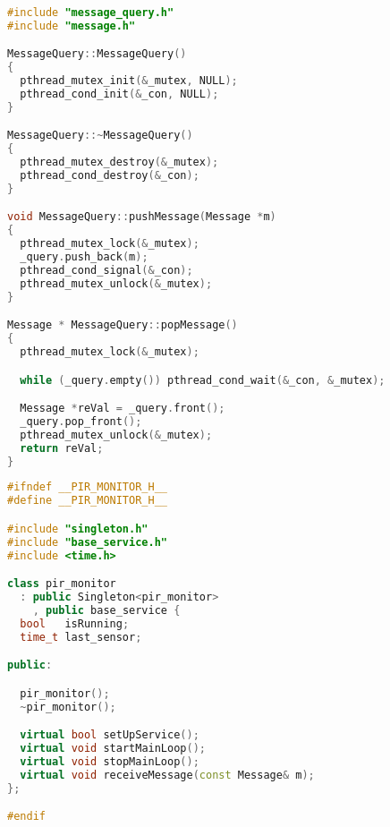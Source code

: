 \begin{lstlisting}[caption=message-query.cpp,language=C++]
#include "message_query.h"
#include "message.h"

MessageQuery::MessageQuery()
{
  pthread_mutex_init(&_mutex, NULL);
  pthread_cond_init(&_con, NULL);
}

MessageQuery::~MessageQuery()
{
  pthread_mutex_destroy(&_mutex);
  pthread_cond_destroy(&_con);
}

void MessageQuery::pushMessage(Message *m)
{
  pthread_mutex_lock(&_mutex);
  _query.push_back(m);
  pthread_cond_signal(&_con);
  pthread_mutex_unlock(&_mutex);
}

Message * MessageQuery::popMessage()
{
  pthread_mutex_lock(&_mutex);

  while (_query.empty()) pthread_cond_wait(&_con, &_mutex);

  Message *reVal = _query.front();
  _query.pop_front();
  pthread_mutex_unlock(&_mutex);
  return reVal;
}
\end{lstlisting}






\begin{lstlisting}[caption=pir-monitor.h,language=C++]
#ifndef __PIR_MONITOR_H__
#define __PIR_MONITOR_H__

#include "singleton.h"
#include "base_service.h"
#include <time.h>

class pir_monitor
  : public Singleton<pir_monitor>
    , public base_service {
  bool   isRunning;
  time_t last_sensor;

public:

  pir_monitor();
  ~pir_monitor();

  virtual bool setUpService();
  virtual void startMainLoop();
  virtual void stopMainLoop();
  virtual void receiveMessage(const Message& m);
};

#endif
\end{lstlisting}






